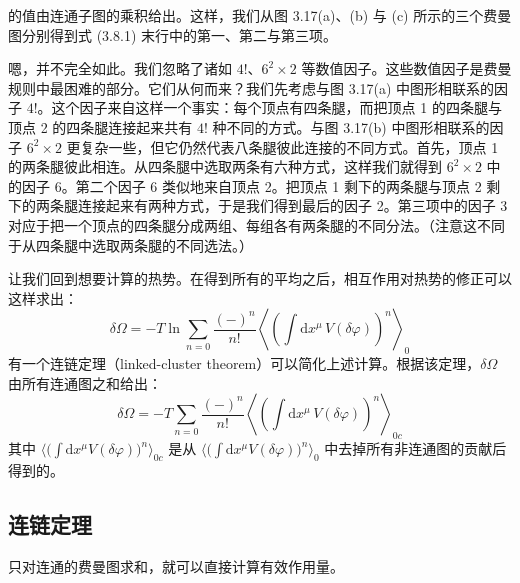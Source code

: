的值由连通子图的乘积给出。这样，我们从图 3.17(a)、(b) 与 (c) 所示的三个费曼图分别得到式 (3.8.1) 末行中的第一、第二与第三项。

嗯，并不完全如此。我们忽略了诸如 $4!$、$6^{2}\times2$ 等数值因子。这些数值因子是费曼规则中最困难的部分。它们从何而来？我们先考虑与图 3.17(a) 中图形相联系的因子 $4!$。这个因子来自这样一个事实：每个顶点有四条腿，而把顶点 1 的四条腿与顶点 2 的四条腿连接起来共有 $4!$ 种不同的方式。与图 3.17(b) 中图形相联系的因子 $6^{2}\times2$ 更复杂一些，但它仍然代表八条腿彼此连接的不同方式。首先，顶点 1 的两条腿彼此相连。从四条腿中选取两条有六种方式，这样我们就得到 $6^{2}\times2$ 中的因子 6。第二个因子 6 类似地来自顶点 2。把顶点 1 剩下的两条腿与顶点 2 剩下的两条腿连接起来有两种方式，于是我们得到最后的因子 2。第三项中的因子 3 对应于把一个顶点的四条腿分成两组、每组各有两条腿的不同分法。（注意这不同于从四条腿中选取两条腿的不同选法。）

让我们回到想要计算的热势。在得到所有的平均之后，相互作用对热势的修正可以这样求出：
\begin{equation*}
\delta\Omega = -T\ln\sum_{n=0}\frac{(-)^{n}}{n!}\left\langle\left(\int \mathrm{d}x^{\mu}\,V(\delta\varphi)\right)^{n}\right\rangle_{0}
\end{equation*}
有一个连链定理（linked-cluster theorem）可以简化上述计算。根据该定理，$\delta\Omega$ 由所有连通图之和给出：
\begin{equation*}
\delta\Omega = -T\sum_{n=0}\frac{(-)^{n}}{n!}\left\langle\left(\int \mathrm{d}x^{\mu}\,V(\delta\varphi)\right)^{n}\right\rangle_{0c}
\end{equation*}
其中 $\big\langle\big(\int \mathrm{d}x^{\mu}V(\delta\varphi)\big)^{n}\big\rangle_{0c}$ 是从 $\big\langle\big(\int \mathrm{d}x^{\mu}V(\delta\varphi)\big)^{n}\big\rangle_{0}$ 中去掉所有非连通图的贡献后得到的。

\subsection{连链定理}
\begin{keypoints}
\item 只对连通的费曼图求和，就可以直接计算有效作用量。
\end{keypoints}


